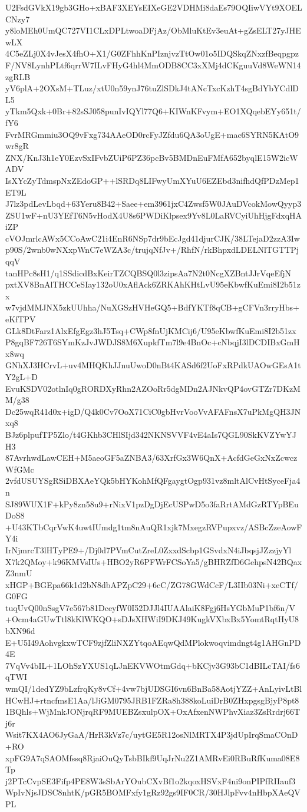 U2FsdGVkX19gb3GHo+xBAF3XEYsEIXeGE2VDHMi8daEs79OQIiwVYt9XOELCNzy7
y8loMEh0UmQC727VI1CLxDPLtwoaDFjAz/ObMluKtEv3euAt+gZsELT27yJHEwLX
4C5eZLj0X4vJesX4fhO+X1/G0ZFhhKnPIznjvzTtOw01o5IDQSkqZNxzfBeqpgpz
F/NV8LynhPLtf6qrrW7ILvFHyG4hl4MmODB8CC3xXMj4dCKguuVd8WeWN14zgRLB
yV6plA+2OXsM+TLuz/xtU0n59ynJ76tuZlSDkJ4tANcTxcKzhT4sgBdYbYCdlDL5
yTkm5Qxk+0Br+82sSJ058punIvIQYl77Q6+KIWnKFvym+EO1XQqebEYy651t/fY6
FvrMRGmmiu3OQ9vFxg734AAeOD0rcFyJZfdu6QA3oUgE+mac6SYRN5KAtO9wr8gR
ZNX/KnJ3h1eY0EzvSxIFvbZUiP6PZ36pcBv5BMDnEuFMfA652byqlE15W2icWADV
IsXYcZyTdmspNxZEdoGP++lSRDq8LIFwyUmXYuU6EZEbd3nifhdQfPDzMep1ET9L
J7lz3pdLevLbqd+63Yeru8B42+Saee+em3961jxC4Zwsf5W0JAuDVcokMowQyyp3
ZSU1wF+nU3YEfT6N5vHodX4U8s6PWDiKlpsex9Yv8L0LaRVCyiUhHjgFdxqHAiZP
cVOJmrlcAWx5CCoAwC21i4EnR6NSp7dr9bEcJgd41djurCJK/38LTejaD2zzA3Iw
p90S/2wnb0wNXxpWnC7eWZA3c/trujqNfJv+/RhfN/rkBhpxdLDELNlTGTTPjqqV
tanHPc8sH1/q1SSdicdBxKeirTZCQBSQ0l3zipsAa7N2t0NcgXZBntJJrVqeEfjN
pxtXV8BnAlTHCCeSIay132oU0xAflAck6ZRKAhKHtLvU95eKbwfKuEmi8I2b51zx
w7vjdMMJNX5zkUUhha/NuXGSzHVHeGQ5+BdfYKTf8qCB+gCFVn3rryHbs+eKfTPV
GLk8DtFarz1AlxEfgEgz3hJ5Tsq+CWp8fnUjKMCij6/U95eKbwfKuEmi8I2b51zx
P8gqBF726T6SYmKzJvJWDJS8M6XupkfTm7l9e4BnOc+cNbqjI3lDCDIBxGmHx8wq
GNhXJ3HCrvL+uv4MHQKhJJnuUwoD0nBt4KASd6f2UoFxRPdkUAOwGEsA1tY2gL+D
EvuKSDV02otlnIq0gRORDXyRhn2AZOoRr5dgMDn2AJNkvQP4ovGTZr7DKzMM/g38
Dc25wqR41d0x+igD/Q4k0Cv7OoX71CiC0gbHvrVooVvAFAFnsX7uPkMgQH3JNxq8
BJz6plpufTP5Zlo/t4GKhb3CHlSIjd342NKNSVVF4vE4aIs7QGL90SkKVZYwYJH3
87AvrhwdLawCEH+M5aeoGF5aZNBA3/63XrfGx3W6QnX+AcfdGeGxNxZcwczWfGMc
2vfdUSUYSgRSiDBXAeYQk5bHYKohMfQFgaygtOgp931vz8mltAlCvHtSyceFja4n
SJ89WUX1F+kPy8zn58u9+rNixV1pzDgDjEcUSPwD5o3faRrtAMdGzRTYpBEuDoS8
+U43KTbCqrVwK4uwtIUmdg1tm8nAuQR1xjk7MxegzRVPupxvz/ASBcZzeAowFY4i
IrNjmrcT3lHTyPE9+/Dj0d7PVmCutZreL0ZxxdScbp1GSvdxN4iJbqsjJZzzjyYl
X7k2QMoy+k96KMVsIUs+HBO2yR6PFWrFCSoYa5/gBHRZfD6GehpsN42BQaxZ3nmU
xHGP+BGEpa66k1d2bN8dbAPZpC29+6cC/ZG78GWdCcF/L3IIb03Ni+xeCTf/G0FG
tuqUvQ00nSsgV7e567b81DceyfW0I52DJJl4IUAAlaiK8Fgj6HsYGbMuP1bf6n/V
+Ocm4aGUwTtl8kKlWKQO+sDJsXHWiI9DKJ49KugkVXbxBx5YomtRqtHyU8bXN96d
E+U5I49AohvgkxwTCF9zjfZliNXZYtqoAEqwQdMPlokwoqvimdngt4g1AHGnPD4E
7VqVv4bIL+1LOhSzYXUS1qLJnEKVWOtmGdq+bKCjv3G93bC1dBILcTAI/fs6qTWI
wmQI/1dedYZ9bLzfrqKy8vCf+4vw7bjUDSGI6vn6BnBa58AotjYZZ+AnLyivLtBl
HCwHJ+rtncfmsE1Aa/lJiGM0795JRB1FZRa8h388koLuiDrB0ZHxpgsgBjyP8pt8
1BQhls+WjMnkJONjrqRF9MUEBZsxulpOX+OxAfxenNWPhvXiaz3ZsRrdrj66Tj6r
Wsit7KX4AO6JyGaA/HrR3kVz7c/uytGE5R12osNlMRTX4P3jdUpIrqSmaCOnD+RO
xpFG9A7qSAOMfssq8RjaiOuQyTsbBIkf9UqJrNu2Z1AMRvEi0RBuRfKuma08E8Tp
j2PTcCvpSE3Fifp4PE8W3sSbArYOubCXvBf1o2kqoxHSVxF4ni9onPIPfRIIauf3
WpIvNjsJDSC8nhtK/pGR5BOMFxfy1gRz92gs9IF0CR/30HJlpFvv4nHbpXAeQVPL

